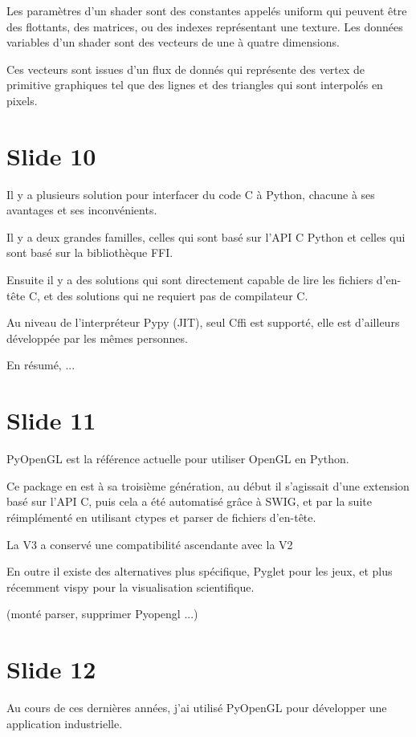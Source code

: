\documentclass[12pt]{article}
\begin{document}
Les paramètres d'un shader sont des constantes appelés uniform qui peuvent être des flottants, des
matrices, ou des indexes représentant une texture. Les données variables d'un shader sont des
vecteurs de une à quatre dimensions.

Ces vecteurs sont issues d'un flux de donnés qui représente des vertex de primitive graphiques tel
que des lignes et des triangles qui sont interpolés en pixels.  

\section{Slide 10}

Il y a plusieurs solution pour interfacer du code C à Python,
chacune à ses avantages et ses inconvénients.

Il y a deux grandes familles, celles qui sont basé sur l'API C Python et celles qui sont basé sur la
bibliothèque FFI.

Ensuite il y a des solutions qui sont directement capable de lire les fichiers d'en-tête C,
et des solutions qui ne requiert pas de compilateur C.

Au niveau de l'interpréteur Pypy (JIT), seul Cffi est supporté, elle est d'ailleurs développée par
les mêmes personnes.

En résumé, ...

\section{Slide 11}

PyOpenGL est la référence actuelle pour utiliser OpenGL en Python.

Ce package en est à sa troisième génération,
au début il s'agissait d'une extension basé sur l'API C,
puis cela a été automatisé grâce à SWIG,
et par la suite réimplémenté en utilisant ctypes et parser de fichiers d'en-tête.

La V3 a conservé une compatibilité ascendante avec la V2

En outre il existe des alternatives plus spécifique,
Pyglet pour les jeux, et plus récemment vispy pour la visualisation scientifique.

(monté parser, supprimer Pyopengl ...)

\section{Slide 12}

Au cours de ces dernières années, j'ai utilisé PyOpenGL pour développer une application
industrielle.
\end{document}
